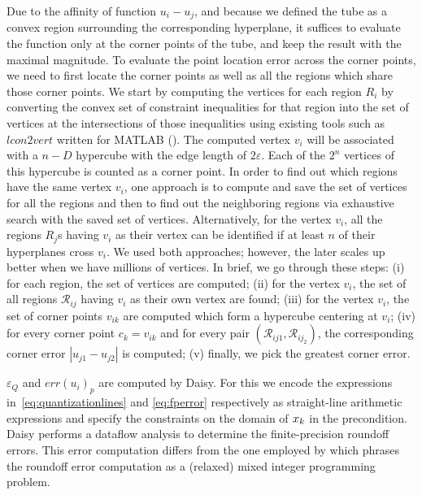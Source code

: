 Due to the affinity of function
$u_{i}-u_{j}$, and because we defined the tube as a convex region surrounding the corresponding hyperplane, it suffices
to evaluate the function only at the corner points of the tube, and keep the
result with the maximal magnitude. To evaluate the point location error across the corner points, we need to first locate the corner points as well as all the regions which share those corner points. We start by computing the vertices for each region $R_i$ by converting the convex set of constraint inequalities for that region into the set of vertices at the intersections of those inequalities using existing tools such as $\mathit{lcon2vert}$ written for MATLAB (\cite{????}). The computed vertex $v_i$ will be associated with a $n-D$ hypercube with the edge length of $2 \varepsilon$. Each of the $2^n$ vertices of this hypercube is counted as a corner point. In order to find out which regions have the same vertex $v_i$, one approach is to compute and save the set of vertices for all the regions and then to find out the neighboring regions via exhaustive search with the saved set of vertices. Alternatively, for the vertex $v_i$, all the regions $R_j$s having $v_i$ as their vertex can be identified if at least $n$ of their hyperplanes cross $v_i$. We used both approaches; however, the later scales up better when we have millions of vertices. In brief, we go through these steps: (i) for each region, the set of vertices are computed; (ii) for the vertex $v_i$, the set of all regions $\mathcal R_{ij}$ having $v_i$ as their own vertex are found; (iii) for the vertex $v_i$, the set of corner points $v_{ik}$ are computed which form a hypercube centering at $v_i$; (iv) for every corner point $c_k=v_{ik}$ and for every pair $(\mathcal R_{ij1},\mathcal R_{ij_2})$, the corresponding corner error $|u_{j1}-u_{j2}|$ is computed; (v) finally, we pick the greatest corner error.



$\varepsilon_Q$ and $err(u_{i})_{p}$ are computed by Daisy. For this we encode
the expressions in~\autoref{eq:quantizationlines} and \autoref{eq:fperror}
respectively as straight-line arithmetic expressions and specify the constraints
on the domain of $x_{k}$ in the precondition.
Daisy performs a dataflow analysis to determine the finite-precision roundoff
errors. This error computation differs from the one employed by
\citet{imperialrmpc} which phrases the roundoff error computation as a (relaxed)
mixed integer programming problem.

